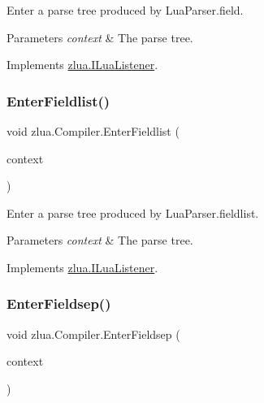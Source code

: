 Enter a parse tree produced by Lua\+Parser.\+field. 


\begin{DoxyParams}{Parameters}
{\em context} & The parse tree.\\
\hline
\end{DoxyParams}


Implements \mbox{\hyperlink{interfacezlua_1_1_i_lua_listener_abd670dc230362e0d50ad8dfffd50eb61}{zlua.\+I\+Lua\+Listener}}.

\mbox{\label{classzlua_1_1_compiler_a4f33b0f6f14a3497db13c22e4d03a10f}} 
\subsubsection{\texorpdfstring{Enter\+Fieldlist()}{EnterFieldlist()}}
{\footnotesize\ttfamily void zlua.\+Compiler.\+Enter\+Fieldlist (\begin{DoxyParamCaption}\item[{\mbox{[}\+Not\+Null\mbox{]} \mbox{\hyperlink{classzlua_1_1_lua_parser_1_1_fieldlist_context}{Lua\+Parser.\+Fieldlist\+Context}}}]{context }\end{DoxyParamCaption})}



Enter a parse tree produced by Lua\+Parser.\+fieldlist. 


\begin{DoxyParams}{Parameters}
{\em context} & The parse tree.\\
\hline
\end{DoxyParams}


Implements \mbox{\hyperlink{interfacezlua_1_1_i_lua_listener_a52d5768d4a26b0d78da5e039713269cc}{zlua.\+I\+Lua\+Listener}}.

\mbox{\label{classzlua_1_1_compiler_a4cd23e46335e41cd5c30ffae494efbec}} 
\subsubsection{\texorpdfstring{Enter\+Fieldsep()}{EnterFieldsep()}}
{\footnotesize\ttfamily void zlua.\+Compiler.\+Enter\+Fieldsep (\begin{DoxyParamCaption}\item[{\mbox{[}\+Not\+Null\mbox{]} \mbox{\hyperlink{classzlua_1_1_lua_parser_1_1_fieldsep_context}{Lua\+Parser.\+Fieldsep\+Context}}}]{context }\end{DoxyParamCaption})}



